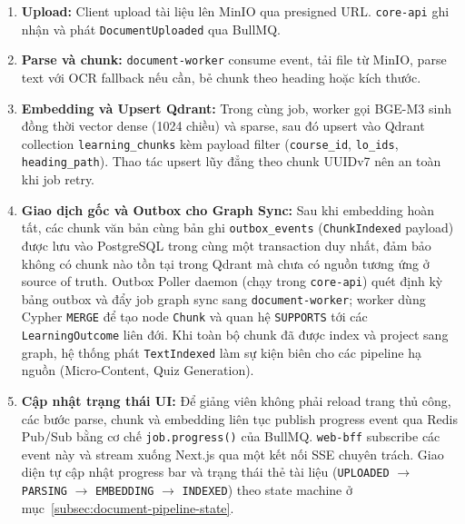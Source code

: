 \begin{enumerate}
    \item \textbf{Upload:} Client upload tài liệu lên MinIO qua presigned URL.
          \texttt{core-api} ghi nhận và phát \texttt{DocumentUploaded} qua
          BullMQ.
    \item \textbf{Parse và chunk:} \texttt{document-worker} consume event,
          tải file từ MinIO, parse text với OCR fallback nếu cần, bẻ chunk
          theo heading hoặc kích thước.
    \item \textbf{Embedding và Upsert Qdrant:} Trong cùng job, worker
          gọi BGE-M3 sinh đồng thời vector dense (1024 chiều) và sparse,
          sau đó upsert vào Qdrant collection \texttt{learning\_chunks}
          kèm payload filter (\texttt{course\_id}, \texttt{lo\_ids},
          \texttt{heading\_path}). Thao tác upsert lũy đẳng theo chunk
          UUIDv7 nên an toàn khi job retry.
    \item \textbf{Giao dịch gốc và Outbox cho Graph Sync:} Sau khi
          embedding hoàn tất, các chunk văn bản cùng bản ghi
          \texttt{outbox\_events} (\texttt{ChunkIndexed} payload) được
          lưu vào PostgreSQL trong cùng một transaction duy nhất, đảm bảo
          không có chunk nào tồn tại trong Qdrant mà chưa có nguồn tương
          ứng ở source of truth. Outbox Poller daemon (chạy trong
          \texttt{core-api}) quét định kỳ bảng outbox và đẩy job graph
          sync sang \texttt{document-worker}; worker dùng Cypher
          \texttt{MERGE} để tạo node \texttt{Chunk} và quan hệ
          \texttt{SUPPORTS} tới các \texttt{LearningOutcome} liên đới.
          Khi toàn bộ chunk đã được index và project sang graph, hệ thống
          phát \texttt{TextIndexed} làm sự kiện biên cho các pipeline hạ
          nguồn (Micro-Content, Quiz Generation).
    \item \textbf{Cập nhật trạng thái UI:} Để giảng viên không phải reload
          trang thủ công, các bước parse, chunk và embedding liên tục
          publish progress event qua Redis Pub/Sub bằng cơ chế
          \texttt{job.progress()} của BullMQ. \texttt{web-bff} subscribe
          các event này và stream xuống Next.js qua một kết nối SSE
          chuyên trách. Giao diện tự cập nhật progress bar và trạng thái
          thẻ tài liệu (\texttt{UPLOADED} $\to$ \texttt{PARSING} $\to$
          \texttt{EMBEDDING} $\to$ \texttt{INDEXED}) theo state machine
          ở mục~\ref{subsec:document-pipeline-state}.
\end{enumerate}

